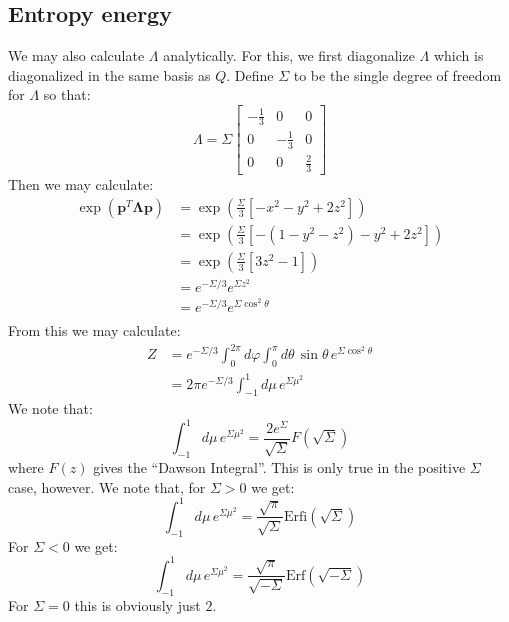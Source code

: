 \documentclass[reqno]{article}
\begin{document}
\subsection{Entropy energy}

We may also calculate $\Lambda$ analytically.
For this, we first diagonalize $\Lambda$ which is diagonalized in the same basis as $Q$.
Define $\Sigma$ to be the single degree of freedom for $\Lambda$ so that:
\begin{equation}
    \Lambda
    =
    \Sigma \begin{bmatrix}
        -\frac13 &0 &0 \\
        0 &-\frac13 &0 \\
        0 &0 &\frac23
    \end{bmatrix}
\end{equation}
Then we may calculate:
\begin{equation}
\begin{split}
    \exp(\mathbf p^T \boldsymbol \Lambda \mathbf p)
    &=
    \exp\left(\frac{\Sigma}{3} \left[-x^2 - y^2 + 2z^2 \right] \right) \\
    &=
    \exp\left(\frac{\Sigma}{3} \left[-\left(1 - y^2 - z^2\right) - y^2 + 2z^2 \right] \right) \\
    &=
    \exp \left( \frac{\Sigma}{3} \left[ 3 z^2 - 1 \right] \right) \\
    &= 
    e^{-\Sigma / 3} e^{\Sigma z^2} \\
    &=
    e^{-\Sigma / 3} e^{\Sigma \cos^2 \theta} \\
\end{split}
\end{equation}
From this we may calculate:
\begin{equation}
\begin{split}
    Z
    &=
    e^{-\Sigma / 3} \int_0^{2\pi} d\varphi \int_0^\pi d\theta \, \sin\theta \, e^{\Sigma \cos^2\theta} \\
    &=
    2 \pi e^{-\Sigma / 3} \int_{-1}^1 d\mu \, e^{\Sigma \mu^2}
\end{split}
\end{equation}
We note that:
\begin{equation}
    \int_{-1}^1 d\mu \, e^{\Sigma \mu^2}
    =
    \frac{2 e^\Sigma}{\sqrt{\Sigma}} F\left(\sqrt{\Sigma}\right)
\end{equation}
where $F(z)$ gives the ``Dawson Integral''.
This is only true in the positive $\Sigma$ case, however. 
We note that, for $\Sigma > 0$ we get:
\begin{equation}
    \int_{-1}^1 d\mu \, e^{\Sigma \mu^2}
    =
    \frac{\sqrt{\pi}}{\sqrt{\Sigma}} \text{Erfi}\left( \sqrt{\Sigma} \right)
\end{equation}
For $\Sigma < 0$ we get:
\begin{equation}
    \int_{-1}^1 d\mu \, e^{\Sigma \mu^2}
    =
    \frac{\sqrt{\pi}}{\sqrt{-\Sigma}} \text{Erf}\left( \sqrt{-\Sigma} \right)
\end{equation}
For $\Sigma = 0$ this is obviously just $2$.
\end{document}
